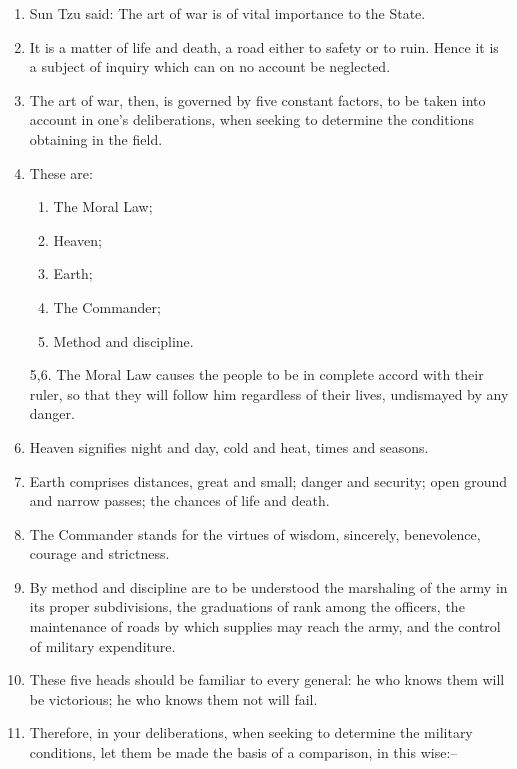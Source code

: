 \begin{enumerate}
\item Sun Tzu said:  The art of war is of vital importance
    to the State.

\item It is a matter of life and death, a road either
    to safety or to ruin.  Hence it is a subject of inquiry
    which can on no account be neglected.

\item The art of war, then, is governed by five constant
    factors, to be taken into account in one's deliberations,
    when seeking to determine the conditions obtaining in the field.

\item These are:  \begin{enumerate}
    \item The Moral Law; 
    \item Heaven; 
    \item Earth;
    \item The Commander; 
    \item Method and discipline.
\end{enumerate}
\item[5,6.] The Moral Law causes the people to be in complete
    accord with their ruler, so that they will follow him
    regardless of their lives, undismayed by any danger.
\setcounter{enumi}{6}
\item Heaven signifies night and day, cold and heat,
    times and seasons.

\item Earth comprises distances, great and small;
    danger and security; open ground and narrow passes;
    the chances of life and death.

\item The Commander stands for the virtues of wisdom,
    sincerely, benevolence, courage and strictness.

\item By method and discipline are to be understood
    the marshaling of the army in its proper subdivisions,
    the graduations of rank among the officers, the maintenance
    of roads by which supplies may reach the army, and the
    control of military expenditure.

\item These five heads should be familiar to every general: 
    he who knows them will be victorious; he who knows them
    not will fail.

\item Therefore, in your deliberations, when seeking
    to determine the military conditions, let them be made
    the basis of a comparison, in this wise:--


\end{enumerate}
